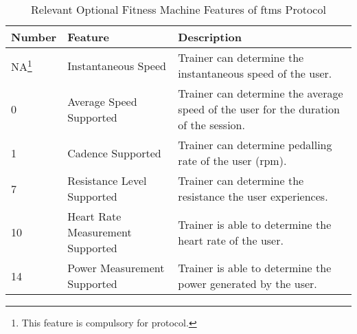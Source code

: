 \begin{minipage}{\textwidth}
	\begin{table}[H]
		\renewcommand{\arraystretch}{1.2}
		\centering
		\caption{Relevant Optional Fitness Machine Features of \ac{ftms} Protocol}
		\begin{tabularx}{\textwidth}{p{1.4cm} >{\raggedright}p{5cm} >{\raggedright\arraybackslash}X}
			\toprule
			Number                                                & Feature                          & Description                                                                          \\
			\midrule
			NA\footnote{This feature is compulsory for protocol.} & Instantaneous Speed              & Trainer can determine the instantaneous speed of the user.                           \\
			0                                                     & Average Speed Supported          & Trainer can determine the average speed of the user for the duration of the session. \\
			1                                                     & Cadence Supported                & Trainer can determine pedalling rate of the user (rpm).                              \\
			7                                                     & Resistance Level Supported       & Trainer can determine the resistance the user experiences.                           \\
			10                                                    & Heart Rate Measurement Supported & Trainer is able to determine the heart rate of the user.                             \\
			14                                                    & Power Measurement Supported      & Trainer is able to determine the power generated by the user.                        \\
			\bottomrule
		\end{tabularx}
		\label{tab:ftmsft}
	\end{table}
\end{minipage}

